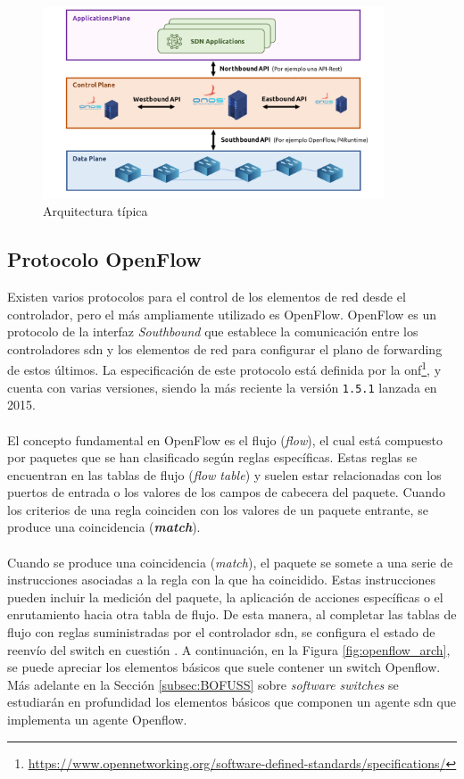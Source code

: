 \begin{figure}[ht]
    \centering
    \includegraphics[width=0.9\textwidth]{archivos/img/teoria/sdn_arch.png}
    \caption{Arquitectura típica  \cite{carrascal2020diseno}}
    \label{fig:sdnBasicArch}
\end{figure}


\subsection{Protocolo OpenFlow}

Existen varios protocolos para el control de los elementos de red desde el controlador, pero el más ampliamente utilizado es OpenFlow. OpenFlow es un protocolo de la interfaz \textit{Southbound} que establece la comunicación entre los controladores \gls{sdn} y los elementos de red para configurar el plano de forwarding de estos últimos. La especificación de este protocolo está definida por la \gls{onf}\footnote{\url{https://www.opennetworking.org/software-defined-standards/specifications/}}, y cuenta con varias versiones, siendo la más reciente la versión \texttt{1.5.1} lanzada en 2015.\\
\\
El concepto fundamental en OpenFlow es el flujo (\textit{flow}), el cual está compuesto por paquetes que se han clasificado según reglas específicas. Estas reglas se encuentran en las tablas de flujo (\textit{flow table}) y suelen estar relacionadas con los puertos de entrada o los valores de los campos de cabecera del paquete. Cuando los criterios de una regla coinciden con los valores de un paquete entrante, se produce una coincidencia (\textbf{\textit{match}}).\\
\\
Cuando se produce una coincidencia (\textit{match}), el paquete se somete a una serie de instrucciones asociadas a la regla con la que ha coincidido. Estas instrucciones pueden incluir la medición del paquete, la aplicación de acciones específicas o el enrutamiento hacia otra tabla de flujo. De esta manera, al completar las tablas de flujo con reglas suministradas por el controlador \gls{sdn}, se configura el estado de reenvío del switch en cuestión \cite{nadeau2013sdn}. A continuación, en la Figura \ref{fig:openflow_arch}, se puede apreciar los elementos básicos que suele contener un switch Openflow. Más adelante en la Sección \ref{subsec:BOFUSS} sobre \textit{software switches} se estudiarán en profundidad los elementos básicos que componen un agente \gls{sdn} que implementa un agente Openflow.


